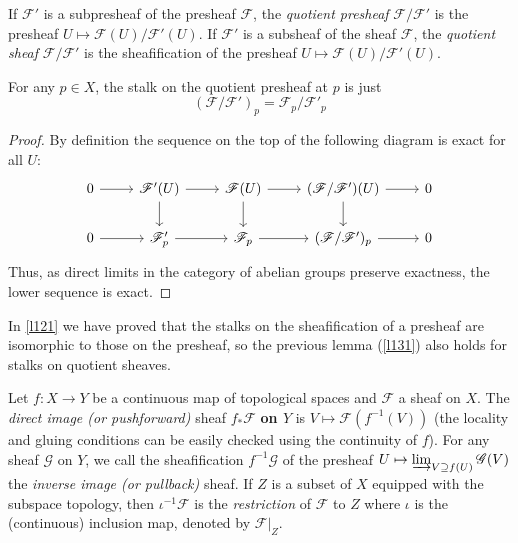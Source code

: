 \documentclass[12pt,letter]{article}
\begin{document}
	If $\mathscr F'$ is a subpresheaf of the presheaf $\mathscr F$, the \textit{quotient presheaf} $\mathscr F/\mathscr F'$ is the presheaf $U\mapsto\mathscr F(U)/\mathscr F'(U)$. If $\mathscr F'$ is a subsheaf of the sheaf $\mathscr F$, the \textit{quotient sheaf} $\mathscr F/\mathscr F'$ is the sheafification of the presheaf $U\mapsto\mathscr F(U)/\mathscr F'(U)$.
	\begin{lemma}\label{l131}
	For any $p\in X$, the stalk on the quotient presheaf at $p$ is just
	\[(\mathscr F/\mathscr F')_p=\mathscr F_p/\mathscr F'_p\]
	\end{lemma}
	\begin{proof}
	By definition the sequence on the top of the following diagram is exact for all $U$:
	\[
	\begin{tikzcd}
0 \arrow[r] & \mathscr F'(U) \arrow[r] \arrow[d] & \mathscr F(U) \arrow[r] \arrow[d] & (\mathscr F/\mathscr F')(U) \arrow[r] \arrow[d] & 0 \\
0 \arrow[r] & \mathscr F_p' \arrow[r]            & \mathscr F_p \arrow[r]            & (\mathscr F/\mathscr F')_p \arrow[r]            & 0
\end{tikzcd}
	\]
	Thus, as direct limits in the category of abelian groups preserve exactness, the lower sequence is exact.
	\end{proof}
	In \autoref{l121} we have proved that the stalks on the sheafification of a presheaf are isomorphic to those on the presheaf, so the previous lemma (\autoref{l131}) also holds for  stalks on quotient sheaves.
	
	Let $f:X\to Y$ be a continuous map of topological spaces and $\mathscr F$ a sheaf on $X$. The \textit{direct image (or pushforward)} sheaf $f_*\mathscr F$ \textbf{on $Y$} is $V\mapsto \mathscr F(f^{-1}(V))$ (the locality and gluing conditions can be easily checked using the continuity of $f$). For any sheaf $\mathscr G$ on $Y$, we call the sheafification $f^{-1}\mathscr G$ of the presheaf $U\mapsto \varinjlim_{V\supseteq f(U)}\mathscr G(V)$ the \textit{inverse image (or pullback)} sheaf. If $Z$ is a subset of $X$ equipped with the subspace topology, then $\iota^{-1}\mathscr F$ is the \textit{restriction} of $\mathscr F$ to $Z$ where $\iota$ is the (continuous) inclusion map, denoted by $\mathscr F|_Z$.
	
\end{document}
